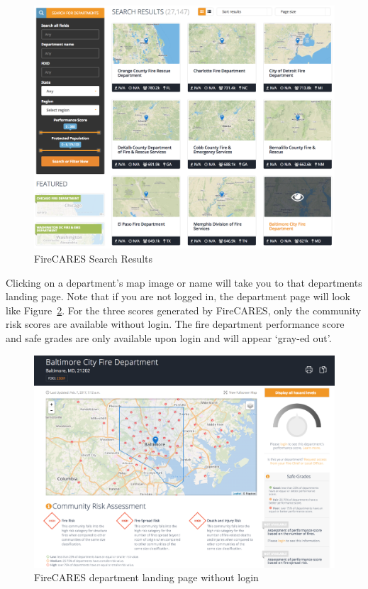 \documentclass[12pt,oneside]{book}
\begin{document}
\begin{figure}[ht!]
\centering
\includegraphics[width=.9\columnwidth]{Figures/search_results}
\caption{FireCARES Search Results}
\label{fig:search}
\end{figure}

\FloatBarrier

Clicking on a department's map image or name will take you to that departments landing page. Note that if you are not logged in, the department page will look like Figure~\ref{fig:department_page_nologin}. For the three scores generated by FireCARES, only the community risk scores are available without login. The fire department performance score and safe grades are only available upon login and will appear `gray-ed out'.

\begin{figure}[ht!]
\centering
\includegraphics[width=.9\columnwidth]{Figures/department_page_logout}
\caption{FireCARES department landing page without login}
\label{fig:department_page_nologin}
\end{figure}
\end{document}
